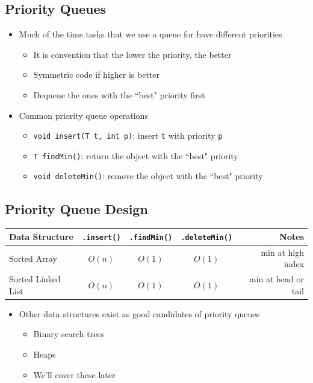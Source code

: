 \documentclass[10pt]{article}
\begin{document}
\subsection*{Priority Queues}
\begin{itemize}
    \item Much of the time tasks that we use a queue for have different priorities
    \begin{itemize}
        \item It is convention that the lower the priority, the better
        \item Symmetric code if higher is better
        \item Dequeue the ones with the ``best" priority first
    \end{itemize}
    \item Common priority queue operations
    \begin{itemize}
        \item \texttt{void insert(T t, int p)}: insert \texttt{t} with priority \texttt{p}
        \item \texttt{T findMin()}: return the object with the ``best" priority
        \item \texttt{void deleteMin()}: remove the object with the ``best" priority
    \end{itemize}
\end{itemize}

\subsection*{Priority Queue Design}
\begin{center}
    \begin{tabular}{lcccr} \toprule
        Data Structure & \texttt{.insert()} & \texttt{.findMin()} & \texttt{.deleteMin()} & Notes \\ \midrule
        Sorted Array & $O(n)$ & $O(1)$ & $O(1)$ & min at high index \\
        Sorted Linked List & $O(n)$ & $O(1)$ & $O(1)$ & min at head or tail \\ \bottomrule
    \end{tabular}
\end{center}
\begin{itemize}
    \item Other data structures exist as good candidates of priority queues
    \begin{itemize}
        \item Binary search trees
        \item Heaps
        \item We'll cover these later
    \end{itemize}
\end{itemize}
\end{document}
